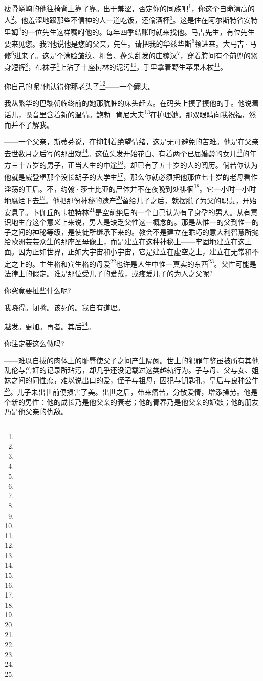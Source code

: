 \par 瘦骨嶙峋的他往椅背上靠了靠。出于羞涩，否定你的同族吧\footnote{}，你这个自命清高的人\footnote{}。他羞涩地跟那些不信神的人一道吃饭，还偷酒杯\footnote{}。这是住在阿尔斯特省安特里姆\footnote{}的一位先生这样嘱咐他的。每年四季结账时就来找他。马吉先生，有位先生要来见您。我?他说他是您的父亲，先生。请把我的华兹华斯\footnote{}领进来。大马吉·马修\footnote{}进来了。这是个满脸皱纹、粗鲁、蓬头乱发的庄稼汉\footnote{}，穿着胯间有个前兜的紧身短裤\footnote{}，布袜子\footnote{}上沾了十座树林的泥污\footnote{}，手里拿着野生苹果木杖\footnote{}。
\par 你自己的呢?他认得你那老头子\footnote{}——一个鳏夫。
\par 我从繁华的巴黎朝临终前的她那肮脏的床头赶去。在码头上摸了摸他的手。他说着话儿，嗓音里含着新的温情。鲍勃·肯尼大夫\footnote{}在护理她。那双眼睛向我祝福，然而并不了解我。
\par ——一个父亲，斯蒂芬说，在抑制着绝望情绪，这是无可避免的苦难。他是在父亲去世数月之后写的那出戏\footnote{}。这位头发开始花白、有着两个已届婚龄的女儿\footnote{}的年方三十五岁的男子，正当人生的中途\footnote{}，却已有了五十岁的人的阅历。倘若你认为他就是威登堡那个没长胡子的大学生\footnote{}，那么你就必须把他那位七十岁的老母看作淫荡的王后。不，约翰·莎士比亚的尸体并不在夜晚到处徘徊\footnote{}。它一小时一小时地腐烂下去\footnote{}。他把那份神秘的遗产\footnote{}留给儿子之后，就摆脱了为父的职责，开始安息了。卜伽丘的卡拉特林\footnote{}是空前绝后的一个自己认为有了身孕的男人。从有意识地生育这个意义上来说，男人是缺乏父性这一概念的。那是从惟一的父到惟一的子之间的神秘等级，是使徒所继承下来的。教会不是建立在乖巧的意大利智慧所抛给欧洲芸芸众生的那座圣母像上，而是建立在这种神秘上——牢固地建立在这上面。因为正如世界，正如大宇宙和小宇宙，它是建立在虚空之上，建立在无常和不定之上的。主生格和宾生格的母爱\footnote{}也许是人生中惟一真实的东西\footnote{}。父性可能是法律上的假定。谁是那位受儿子的爱戴，或疼爱儿子的为人之父呢?
\par 你究竟要扯些什么呢?
\par 我晓得。闭嘴。该死的。我自有道理。
\par 越发。更加。再者。其后\footnote{}。
\par 你注定要这么做吗?
\par ——难以自拔的肉体上的耻辱使父子之间产生隔阂。世上的犯罪年鉴虽被所有其他乱伦与兽奸的记录所玷污，却几乎还没记载过这类越轨行为。子与母、父与女、姐妹之间的同性恋，难以说出口的爱，侄子与祖母，囚犯与钥匙孔，皇后与良种公牛\footnote{}。儿子未出世前便损害了美。出世之后，带来痛苦，分散爱情，增添操劳。他是个新的男性：他的成长乃是他父亲的衰老；他的青春乃是他父亲的妒嫉；他的朋友乃是他父亲的仇敌。
